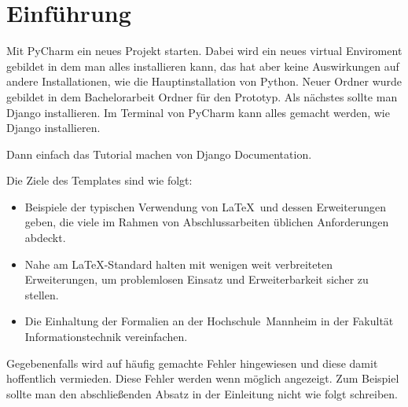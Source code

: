 \documentclass[11pt,a4paper]{report}
\begin{document}

\begin{abstract} 
\LaTeX\ bietet Buchdruckqualität für jedermann.
Wir zeigen anhand dieses durch persönliche Präferenzen geprägtes Template, 
wie man Buchdruckqualität für eine Abschlussarbeit einfach erreichen kann.
Dazu werden beispielhaft Lösungen zu üblichen Fragestellungen im Dokument 
vorgestellt.
Zunächst benötigt man ein passendes \LaTeX\ System mit einigen 
installierten Erweiterungspaketen, das es erlaubt das Template zu 
übersetzen. 
Neben den grundlegenden For\-ma\-tie\-rungs\-möglich\-keiten mit \LaTeX\ wird 
insbesondere das Erstellen und Einbinden von Grafiken, Listings und 
mathematischen Formeln gezeigt.
Des Weiteren werden Literatur- und andere Verzeichnisse eingebunden.
Nicht zuletzt finden sich auch sachdienliche Hinweise zum
Schreiben und Zitieren von Literatur.
\end{abstract}

\tableofcontents %

\chapter{Einführung} \label{chap:einf}

Mit PyCharm ein neues Projekt starten. Dabei wird ein neues virtual Enviroment gebildet in dem man alles installieren kann, das hat aber keine Auswirkungen auf andere Installationen, wie die Hauptinstallation von Python. Neuer Ordner wurde gebildet in dem Bachelorarbeit Ordner für den Prototyp. Als nächstes sollte man Django installieren. Im Terminal von PyCharm kann alles gemacht werden, wie Django installieren.

Dann einfach das Tutorial machen von Django Documentation.






Die Ziele des Templates sind wie folgt:
\begin{itemize}
\item Beispiele der typischen Verwendung von \LaTeX\ und dessen Erweiterungen 
  geben, die viele im Rahmen von Abschlussarbeiten üblichen Anforderungen 
  abdeckt.
\item Nahe am \LaTeX-Standard halten mit wenigen weit verbreiteten 
  Erweiterungen, um problemlosen Einsatz und Erweiterbarkeit sicher zu stellen.
\item Die Einhaltung der Formalien an der Hochschule~Mannheim in der
  Fakultät Informationstechnik vereinfachen.
\end{itemize}
Gegebenenfalls wird auf häufig gemachte Fehler hingewiesen und diese damit 
hoffentlich vermieden. 
Diese Fehler werden wenn möglich  angezeigt. 
Zum Beispiel sollte man den abschließenden Absatz in der Einleitung 
nicht wie folgt schreiben.
\end{document}
